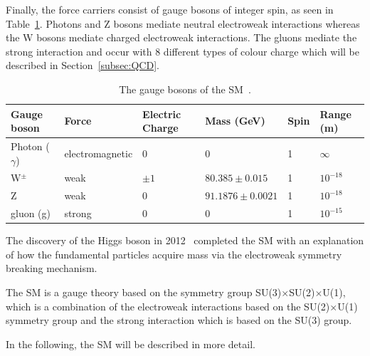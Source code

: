 Finally, the force carriers consist of gauge bosons of integer spin, as seen in Table~\ref{table:SMbosons}. Photons and Z bosons mediate neutral electroweak interactions whereas the W bosons mediate charged electroweak interactions. The gluons mediate the strong interaction and occur with 8 different types of colour charge which will be described in Section~\ref{subsec:QCD}. 
\begin{table}[ht!]
\centering
\footnotesize
\begin{tabular}{|l|l|l|l|l|l|}
\hline
Gauge boson                       & Force           & Electric Charge & Mass (GeV) & Spin & Range (m)  \\ \hline \hline
Photon ($\gamma$)                 & electromagnetic & 0      & 0          & 1    & $\infty$   \\ \hline
W$^{\pm}$                         & weak            & $\pm1$ & $80.385\pm0.015$           & 1    & $10^{-18}$ \\ \hline
Z                                 & weak            & 0      & $91.1876\pm0.0021$           & 1    & $10^{-18}$ \\ \hline
gluon (g)                            & strong          & 0      & 0          & 1    & $10^{-15}$ \\ \hline
\end{tabular}
\caption{The gauge bosons of the SM~\cite{PDG2016}.}
\label{table:SMbosons}
\end{table}

The discovery of the Higgs boson in 2012~\cite{Higgs2012observation,Aad:2012tfa,Aad:2015zhl} completed the SM with an explanation of how the fundamental particles acquire mass via the electroweak symmetry breaking mechanism.

The SM is a gauge theory based on the symmetry group SU(3)$\times$SU(2)$\times$U(1), which is a combination of the electroweak interactions based on the SU(2)$\times$U(1) symmetry group and the strong interaction which is based on the SU(3) group.

In the following, the SM will be described in more detail.

